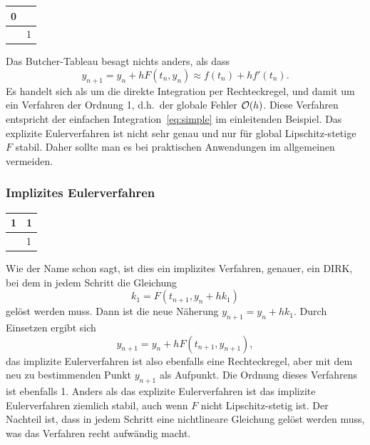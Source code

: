 \begin{center}
  \renewcommand{\arraystretch}{1.3}
  \begin{tabular}{r|l}
    0 & \\\hline
    & 1
  \end{tabular}
\end{center}

Das Butcher-Tableau besagt nichts anders, als dass
\begin{equation}
  y_{n+1} = y_n + h F(t_n, y_n) \approx f(t_n) + h f'(t_n).
\end{equation}
Es handelt sich als um die direkte Integration per Rechteckregel, und
damit um ein Verfahren der Ordnung 1, d.h.\ der globale Fehler
$\mathcal O(h)$. Diese Verfahren entspricht der einfachen
Integration~\eqref{eq:simple} im einleitenden Beispiel. Das explizite
Eulerverfahren ist nicht sehr genau und nur für global
Lipschitz-stetige $F$ stabil. Daher sollte man es bei praktischen
Anwendungen im allgemeinen vermeiden.

\subsubsection{Implizites Eulerverfahren}

\begin{center}
  \renewcommand{\arraystretch}{1.3}
  \begin{tabular}{r|l}
    1 & 1\\\hline
    & 1
  \end{tabular}
\end{center}

Wie der Name schon sagt, ist dies ein implizites Verfahren, genauer,
ein DIRK, bei dem in jedem Schritt die Gleichung
\begin{equation}
  k_1 = F(t_{n+1}, y_n + h k_1)
\end{equation}
gelöst werden muss. Dann ist die neue Näherung $y_{n+1} = y_n + h
k_1$. Durch Einsetzen ergibt sich 
\begin{equation}
  y_{n+1} = y_n + h F(t_{n+1}, y_{n+1}),
\end{equation}
das implizite Eulerverfahren ist also ebenfalls eine Rechteckregel,
aber mit dem neu zu bestimmenden Punkt $y_{n+1}$ als Aufpunkt. Die
Ordnung dieses Verfahrens ist ebenfalls 1. Anders als das explizite
Eulerverfahren ist das implizite Eulerverfahren ziemlich stabil, auch
wenn $F$ nicht Lipschitz-stetig ist. Der Nachteil ist, dass in jedem
Schritt eine nichtlineare Gleichung gelöst werden muss, was das
Verfahren recht aufwändig macht.

